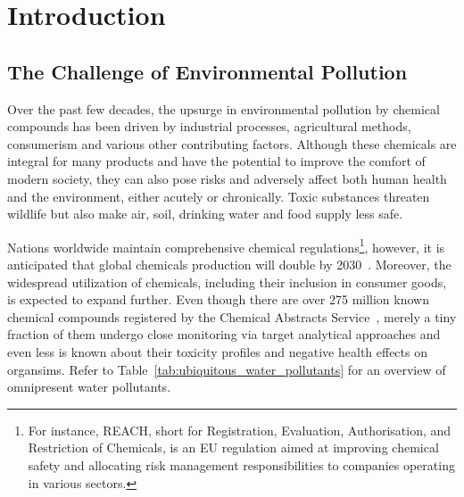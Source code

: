 \chapter{Introduction}\label{chap:introduction}

\section{The Challenge of Environmental Pollution}

Over the past few decades, the upsurge in environmental pollution by chemical compounds has been driven by industrial processes, agricultural methods, consumerism and various other contributing factors. Although these chemicals are integral for many products and have the potential to improve the comfort of modern society, they can also pose risks and adversely affect both human health and the environment, either acutely or chronically. Toxic substances threaten wildlife but also make air, soil, drinking water and food supply less safe. 

Nations worldwide maintain comprehensive chemical regulations\footnote{For instance, REACH, short for Registration, Evaluation, Authorisation, and Restriction of Chemicals, is an EU regulation aimed at improving chemical safety and allocating risk management responsibilities to companies operating in various sectors.}, however, it is anticipated that global chemicals production will double by 2030~\cite{chemicaloutlook}. Moreover, the widespread utilization of chemicals, including their inclusion in consumer goods, is expected to expand further.
Even though there are over 275 million known chemical compounds registered by the Chemical Abstracts Service~\cite{CAS}, merely a tiny fraction of them undergo close monitoring via target analytical approaches and even less is known about their toxicity profiles and negative health effects on organsims. Refer to Table~\ref{tab:ubiquitous_water_pollutants} for an overview of omnipresent water pollutants.

